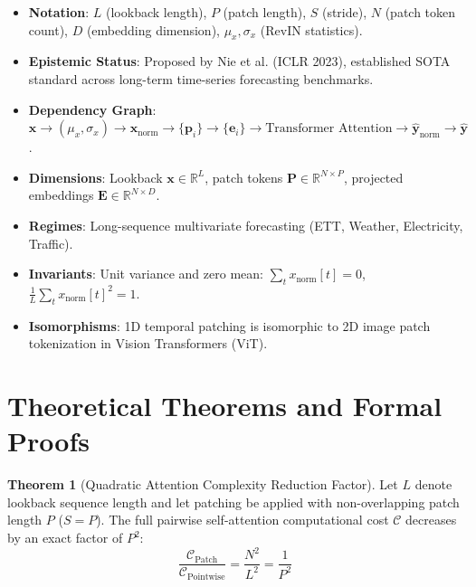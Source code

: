 \documentclass[11pt,a4paper]{article}
\theoremstyle{definition}
\newtheorem{theorem}{\textbf{Theorem}}[section]
\begin{document}
\begin{itemize}
    \item \textbf{Notation}: $L$ (lookback length), $P$ (patch length), $S$ (stride), $N$ (patch token count), $D$ (embedding dimension), $\mu_x, \sigma_x$ (RevIN statistics).
    \item \textbf{Epistemic Status}: Proposed by Nie et al. (ICLR 2023), established SOTA standard across long-term time-series forecasting benchmarks.
    \item \textbf{Dependency Graph}: $\mathbf{x} \to (\mu_x, \sigma_x) \to \mathbf{x}_{\text{norm}} \to \{\mathbf{p}_i\} \to \{\mathbf{e}_i\} \to \text{Transformer Attention} \to \widehat{\mathbf{y}}_{\text{norm}} \to \widehat{\mathbf{y}}$.
    \item \textbf{Dimensions}: Lookback $\mathbf{x} \in \mathbb{R}^L$, patch tokens $\mathbf{P} \in \mathbb{R}^{N \times P}$, projected embeddings $\mathbf{E} \in \mathbb{R}^{N \times D}$.
    \item \textbf{Regimes}: Long-sequence multivariate forecasting (ETT, Weather, Electricity, Traffic).
    \item \textbf{Invariants}: Unit variance and zero mean: $\sum_{t} x_{\text{norm}}[t] = 0$, $\frac{1}{L}\sum_t x_{\text{norm}}[t]^2 = 1$.
    \item \textbf{Isomorphisms}: 1D temporal patching is isomorphic to 2D image patch tokenization in Vision Transformers (ViT).
\end{itemize}

\section{Theoretical Theorems and Formal Proofs}

\begin{theorem}[Quadratic Attention Complexity Reduction Factor]
Let $L$ denote lookback sequence length and let patching be applied with non-overlapping patch length $P$ ($S = P$). The full pairwise self-attention computational cost $\mathcal{C}$ decreases by an exact factor of $P^2$:
{\boldmath
\begin{equation}
\frac{\mathcal{C}_{\text{Patch}}}{\mathcal{C}_{\text{Pointwise}}} = \frac{N^2}{L^2} = \frac{1}{P^2}
\end{equation}
}
\end{theorem}
\end{document}
